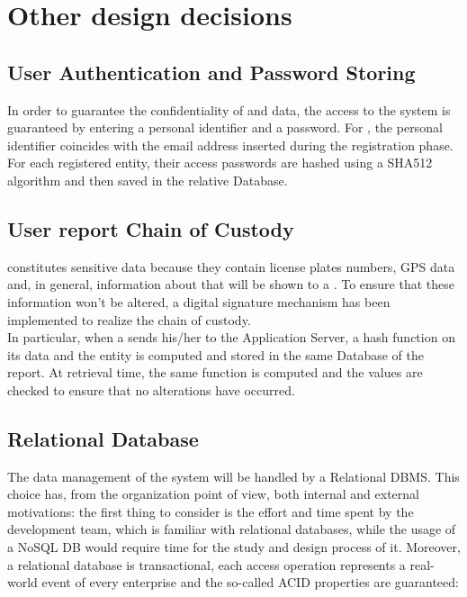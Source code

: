\documentclass[../../DD.tex]{subfiles}
\begin{document}
\section{Other design decisions\label{sect:2.7}}

\subsection{User Authentication and Password Storing\label{2.7.1}}
In order to guarantee the confidentiality of  and  data, the access to the system is guaranteed by entering a personal identifier and a password. For , the personal identifier coincides with the email address inserted during the registration phase. \\

For each registered entity, their access passwords are hashed using a SHA512 algorithm and then saved in the relative Database.

\subsection{User report Chain of Custody\label{2.7.2}}
 constitutes sensitive data because they contain license plates numbers, GPS data and, in general, information about  that will be shown to a . To ensure that these information won't be altered, a digital signature mechanism has been implemented to realize the chain of custody. \\

In particular, when a  sends his/her  to the Application Server, a hash function on its data and the  entity is computed and stored in the same Database of the report. At retrieval time, the same function is computed and the values are checked to ensure that no alterations have occurred.

\subsection{Relational Database\label{2.7.3}}
The data management of the system will be handled by a Relational DBMS. This choice has, from the organization point of view, both internal and external motivations: the first thing to consider is the effort and time spent by the development team, which is familiar with relational databases, while the usage of a NoSQL DB would require time for the study and design process of it.
Moreover, a relational database is transactional, each access operation represents a real-world event of every enterprise and the so-called ACID properties are guaranteed:
\end{document}
